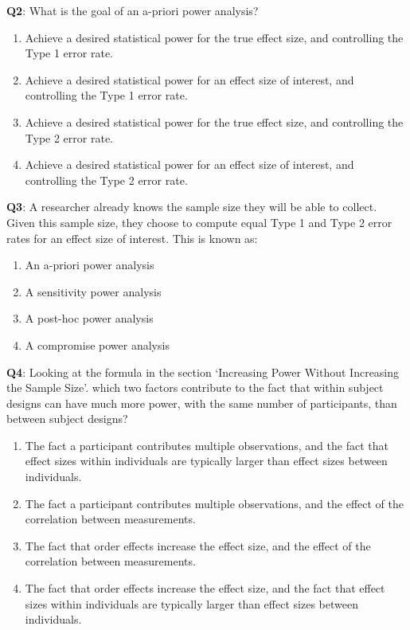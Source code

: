 \documentclass[
  oneside]{krantz}
\providecommand{\tightlist}{%
  \setlength{\itemsep}{0pt}\setlength{\parskip}{0pt}}
\begin{document}
\textbf{Q2}: What is the goal of an a-priori power analysis?

\begin{enumerate}
\def\labelenumi{\Alph{enumi})}
\tightlist
\item
  Achieve a desired statistical power for the true effect size, and controlling the Type 1 error rate.
\item
  Achieve a desired statistical power for an effect size of interest, and controlling the Type 1 error rate.
\item
  Achieve a desired statistical power for the true effect size, and controlling the Type 2 error rate.
\item
  Achieve a desired statistical power for an effect size of interest, and controlling the Type 2 error rate.
\end{enumerate}

\textbf{Q3}: A researcher already knows the sample size they will be able to collect. Given this sample size, they choose to compute equal Type 1 and Type 2 error rates for an effect size of interest. This is known as:

\begin{enumerate}
\def\labelenumi{\Alph{enumi})}
\tightlist
\item
  An a-priori power analysis
\item
  A sensitivity power analysis
\item
  A post-hoc power analysis
\item
  A compromise power analysis
\end{enumerate}

\textbf{Q4}: Looking at the formula in the section `Increasing Power Without Increasing the Sample Size'. which two factors contribute to the fact that within subject designs can have much more power, with the same number of participants, than between subject designs?

\begin{enumerate}
\def\labelenumi{\Alph{enumi})}
\tightlist
\item
  The fact a participant contributes multiple observations, and the fact that effect sizes within individuals are typically larger than effect sizes between individuals.
\item
  The fact a participant contributes multiple observations, and the effect of the correlation between measurements.
\item
  The fact that order effects increase the effect size, and the effect of the correlation between measurements.
\item
  The fact that order effects increase the effect size, and the fact that effect sizes within individuals are typically larger than effect sizes between individuals.
\end{enumerate}
\end{document}
